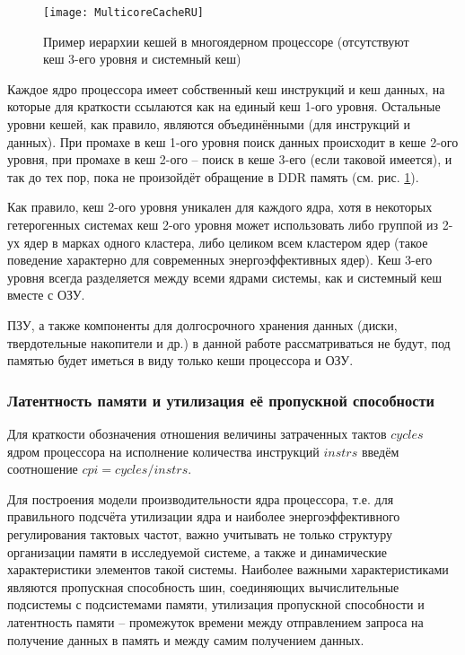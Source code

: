     \begin{figure}[!h]
        \caption{Пример иерархии кешей в многоядерном процессоре (отсутствуют кеш 3-его уровня
            и системный кеш)}
        \centering
        \texttt{[image: MulticoreCacheRU]}
        \label{MulticoreCache}
    \end{figure}

    Каждое ядро процессора имеет собственный кеш инструкций и кеш данных, на которые для краткости
    ссылаются как на единый кеш 1-ого уровня. Остальные уровни кешей, как правило, являются объединёнными
    (для инструкций и данных).
    При промахе в кеш 1-ого уровня поиск данных происходит в кеше 2-ого уровня, при промахе
    в кеш 2-ого -- поиск в кеше 3-его (если таковой имеется), и так до тех пор, пока не произойдёт
    обращение в DDR память (см. рис. \ref{MulticoreCache}).

    Как правило, кеш 2-ого уровня уникален для каждого ядра, хотя в некоторых гетерогенных системах
    кеш 2-ого уровня может использовать либо группой из 2-ух ядер в марках одного кластера, либо
    целиком всем кластером ядер (такое поведение характерно для современных энергоэффективных ядер).
    Кеш 3-его уровня всегда разделяется между всеми ядрами системы, как и системный кеш вместе с ОЗУ.

    ПЗУ, а также компоненты для долгосрочного хранения данных (диски, твердотельные накопители и др.)
    в данной работе рассматриваться не будут, под памятью будет иметься в виду только кеши процессора
    и ОЗУ.

\subsubsection{Латентность памяти и утилизация её пропускной способности} \label{lat_util_chapter}

    Для краткости обозначения отношения величины затраченных тактов $cycles$ ядром процессора на исполнение
    количества инструкций $instrs$ введём соотношение $cpi = cycles / instrs$.

    Для построения модели производительности ядра процессора, т.е. для правильного подсчёта утилизации
    ядра и наиболее энергоэффективного регулирования тактовых частот, важно учитывать не только
    структуру организации памяти в исследуемой системе, а также и динамические характеристики
    элементов такой системы. Наиболее важными характеристиками являются пропускная способность шин,
    соединяющих вычислительные подсистемы с подсистемами памяти, утилизация пропускной способности и
    латентность памяти -- промежуток времени между отправлением запроса на получение данных в память и
    между самим получением данных.

